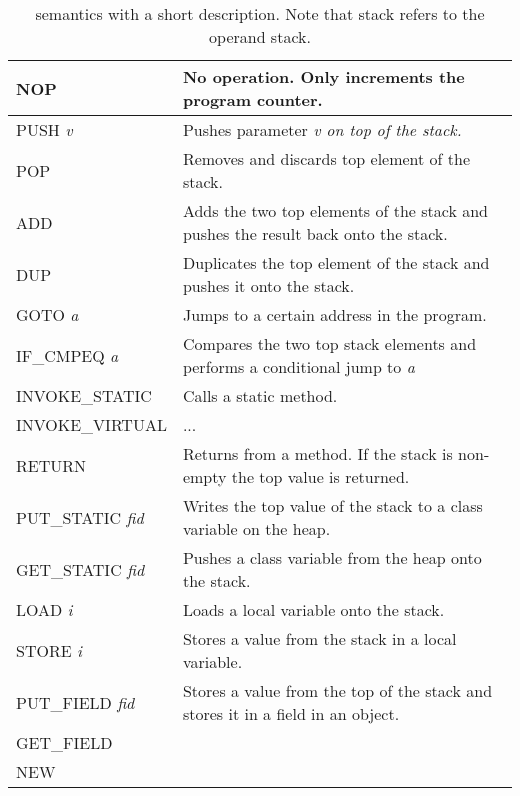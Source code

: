 \section{\jcl}
\begin{table}[]
\centering
\label{tab:instr}
\begin{tabular}{l|l}
\hline
NOP             		  & No operation. Only increments the program counter. \\ \hline
PUSH \textit{v}           & Pushes parameter \textit{v on top of the stack.} \\ \hline
POP             		  & Removes and discards top element of the stack.\\ \hline
ADD             		  & Adds the two top elements of the stack and pushes the result back onto the stack.  \\ \hline
DUP             		  & Duplicates the top element of the stack and pushes it onto the stack. \\ \hline
GOTO \textit{a}           & Jumps to a certain address in the program.  \\ \hline
IF\_CMPEQ \textit{a}   	  & Compares the two top stack elements and performs a conditional jump to \textit{a}  \\ \hline
INVOKE\_STATIC     		  & Calls a static method.  \\ \hline
INVOKE\_VIRTUAL 		  & ...  \\ \hline
RETURN                    & Returns from a method. If the stack is non-empty the top value is returned.   \\ \hline
PUT\_STATIC \textit{fid}  & Writes the top value of the stack to a class variable on the heap.  \\ \hline
GET\_STATIC \textit{fid}  & Pushes a class variable from the heap onto the stack. \\ \hline
LOAD \textit{i}           & Loads a local variable onto the stack.  \\ \hline
STORE \textit{i}          & Stores a value from the stack in a local variable.\\ \hline
PUT\_FIELD \textit{fid}   & Stores a value from the top of the stack and stores it in a field in an object.   \\ \hline
GET\_FIELD      &   \\ \hline
NEW             &   \\ \hline  
\end{tabular}
\caption{\jcl semantics with a short description. Note that stack refers to the operand stack.}
\end{table}
